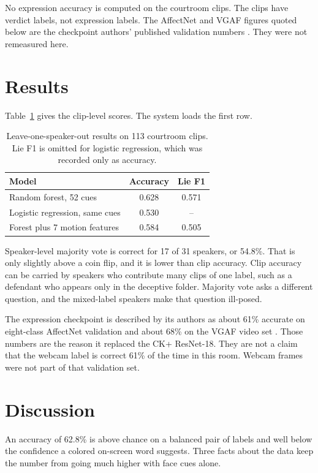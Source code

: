 \documentclass[conference]{IEEEtran}
\begin{document}
No expression accuracy is computed on the courtroom clips. The clips have verdict labels, not expression labels. The AffectNet and VGAF figures quoted below are the checkpoint authors' published validation numbers \cite{savchenko2021hsemotion}. They were not remeasured here.

\section{Results}
Table~\ref{tab:results} gives the clip-level scores. The system loads the first row.

\begin{table}[t]
\caption{Leave-one-speaker-out results on 113 courtroom clips. Lie F1 is omitted for logistic regression, which was recorded only as accuracy.}
\label{tab:results}
\centering
\begin{tabular}{lcc}
\toprule
Model & Accuracy & Lie F1 \\
\midrule
Random forest, 52 cues & 0.628 & 0.571 \\
Logistic regression, same cues & 0.530 & -- \\
Forest plus 7 motion features & 0.584 & 0.505 \\
\bottomrule
\end{tabular}
\end{table}

Speaker-level majority vote is correct for 17 of 31 speakers, or 54.8\%. That is only slightly above a coin flip, and it is lower than clip accuracy. Clip accuracy can be carried by speakers who contribute many clips of one label, such as a defendant who appears only in the deceptive folder. Majority vote asks a different question, and the mixed-label speakers make that question ill-posed.

The expression checkpoint is described by its authors as about 61\% accurate on eight-class AffectNet validation and about 68\% on the VGAF video set \cite{savchenko2021hsemotion}. Those numbers are the reason it replaced the CK+ ResNet-18. They are not a claim that the webcam label is correct 61\% of the time in this room. Webcam frames were not part of that validation set.

\section{Discussion}
An accuracy of 62.8\% is above chance on a balanced pair of labels and well below the confidence a colored on-screen word suggests. Three facts about the data keep the number from going much higher with face cues alone.
\end{document}
